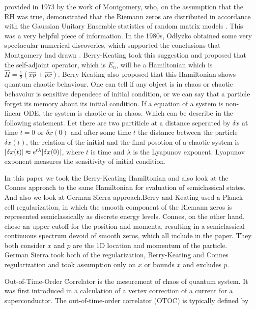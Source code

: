 \documentclass[12pt]{report}
\newcommand*{\1}{\hspace{1pt}}
\begin{document}
    provided in 1973 by the work of Montgomery, who, on the assumption that the RH was true, demonstrated that the Riemann zeros are distributed in accordance with 
    the Gaussian Unitary Ensemble statistics of random matrix models \cite{s35}. This was a very helpful piece of information. In the 1980s, Odlyzko obtained some very
    spectacular numerical discoveries, which supported the conclusions that Montgomery had drawn \cite{s36}.  Berry-Keating took this suggestion 
    and proposed that the self-adjoint operator, which 
    is $E_{n}$, will be a Hamiltonian which is $\hat{H} = \frac{1}{2}(\hat{x}\hat{p} + \hat{p}\hat{x})$. Berry-Keating also proposed that this Hamiltonian shows quantum chaotic behaviour.
    One can tell if any object is in chaos or chaotic behavoiur is sensitive dependece of initial condition, or we can say that a particle forget its memory about its initial condition.
    If a equation of a system is non-linear ODE, the system is chaotic or in chaos. Which can be describe in the following statement. Let there are two partiticle at a distance 
    seperated by $\delta x$ at time $t=0$ or  $\delta x(0)$ and after some time $t$ the distance between the particle $\delta x(t)$, the relation of the initial and the final posotion 
    of a chaotic system is $|\delta x(t)| \thickapprox e^{t\lambda} |\delta x(0)|$, where $t$ is time and $\lambda$ is the Lyapunov exponent. Lyapunov exponent measures the sensitivity of initial 
    condition.

    In this paper we took the Berry-Keating Hamiltonian and also look at the Connes approach to the same Hamiltonian for evaluation of semiclassical states.\cite{s1,s15,s3}
    And also we look at German Sierra approach.\cite{s13}Berry and Keating used a Planck cell regularization, in which the smooth component 
    of the Riemann zeros is represented semiclassically as discrete energy levels. Connes, on the other hand, chose an upper 
    cutoff for the position and momenta, resulting in a semiclassical continuous spectrum devoid of smooth zeros, which all include in the paper.
    They both consider $x$ and $p$ are the 1D location and momentum of the particle. German Sierra took both of the regularization, Berry-Keating and Connes regularization 
    and took assumption only on $x$ or bounds $x$ and excludes $p$.

    Out-of-Time-Order Correlator is the mesurement of chaos  of quantum system. It was first introduced in a calculation of a vertex correction of a current for a 
    superconductor\cite{s12}.
    The out-of-time-order correlator (OTOC) is typically defined by \cite{s11}
\end{document}

